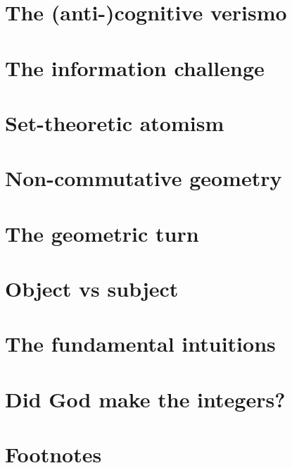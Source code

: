 \documentclass{article}
\begin{document}
\section{The (anti-)cognitive verismo}
\section{The information challenge}
\section{Set-theoretic atomism}
\section{Non-commutative geometry}
\section{The geometric turn}
\section{Object vs subject}
\section{The fundamental intuitions}
\section{Did God make the integers?}
\section*{Footnotes}
\end{document}
